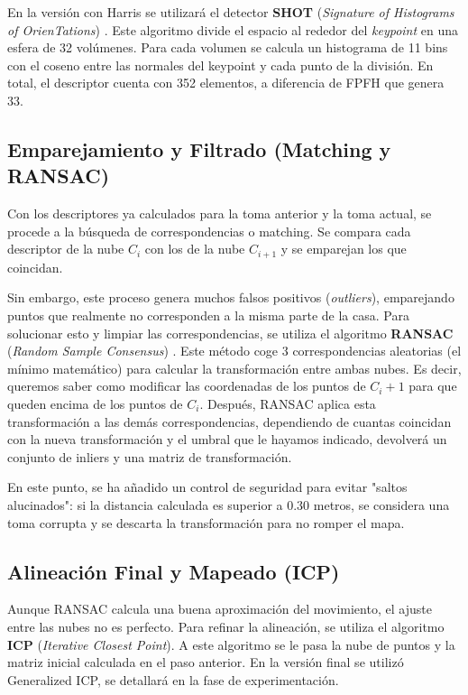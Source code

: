 \documentclass[11pt,letterpaper, onecolumn]{article}
\begin{document}
En la versión con Harris se utilizará el detector \textbf{SHOT} (\textit{Signature of Histograms of OrienTations}) \parencite{tombari2010unique}. Este algoritmo divide el espacio al rededor del \textit{keypoint} en una esfera de 32 volúmenes. Para cada volumen se calcula un histograma de
11 bins con el coseno entre las normales del keypoint y cada punto de la división. En total, el descriptor cuenta con 352 elementos, a diferencia de FPFH que genera 33. 


\subsection{Emparejamiento y Filtrado (Matching y RANSAC)}
Con los descriptores ya calculados para la toma anterior y la toma actual, se procede a la búsqueda de correspondencias o matching. Se compara cada descriptor de la nube $C_i$ con los de la nube $C_{i+1}$ y se emparejan los que coincidan. 

Sin embargo, este proceso genera muchos falsos positivos (\textit{outliers}), emparejando puntos que realmente no corresponden a la misma parte de la casa. Para solucionar esto y limpiar las correspondencias, se utiliza el algoritmo \textbf{RANSAC} (\textit{Random Sample Consensus}) \parencite{fischler1981random}. Este método coge 3 correspondencias aleatorias (el mínimo matemático) para calcular la transformación entre ambas nubes. Es decir, queremos saber como modificar las coordenadas de los puntos de $C_i+1$ para que queden encima de los puntos de $C_i$. Después, RANSAC aplica esta transformación a las demás correspondencias, dependiendo de cuantas coincidan con la nueva transformación y el umbral que le hayamos indicado, devolverá un conjunto de inliers y una matriz de transformación.

En este punto, se ha añadido un control de seguridad para evitar "saltos alucinados": si la distancia calculada es superior a $0.30$ metros, se considera una toma corrupta y se descarta la transformación para no romper el mapa.


\subsection{Alineación Final y Mapeado (ICP)}
Aunque RANSAC calcula una buena aproximación del movimiento, el ajuste entre las nubes no es perfecto. Para refinar la alineación, se utiliza el algoritmo \textbf{ICP} (\textit{Iterative Closest Point}). A este algoritmo se le pasa la nube de puntos y la matriz inicial calculada en el paso anterior. En la versión final se utilizó Generalized ICP, se detallará en la fase de experimentación.
\end{document}
